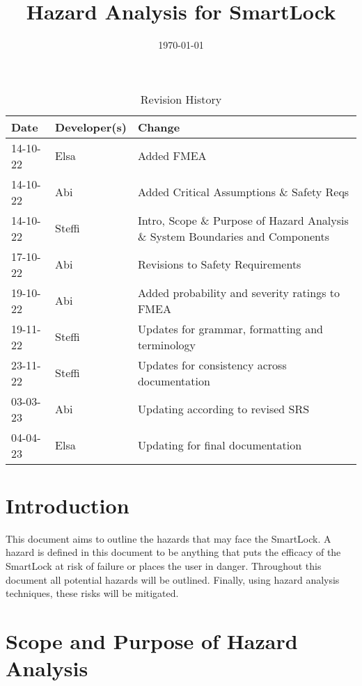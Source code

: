 \documentclass{article}
\title{Hazard Analysis for SmartLock\\\progname}
\author{\authname}
\date{\today}
\begin{document}
\maketitle
\thispagestyle{empty}

\newpage
{}

\begin{table}[hp]
\caption{Revision History} \label{TblRevisionHistory}
\begin{tabularx}{\textwidth}{llX}
\toprule
\textbf{Date} & \textbf{Developer(s)} & \textbf{Change}\\
\midrule
14-10-22 & Elsa & Added FMEA\\
14-10-22 & Abi & Added Critical Assumptions \& Safety Reqs\\
14-10-22 & Steffi & Intro, Scope \& Purpose of Hazard Analysis \& System Boundaries and Components\\
17-10-22 & Abi & Revisions to Safety Requirements\\
19-10-22 & Abi & Added probability and severity ratings to FMEA \\
19-11-22 & Steffi & Updates for grammar, formatting and terminology\\
23-11-22 & Steffi & Updates for consistency across documentation\\
03-03-23 & Abi & Updating according to revised SRS\\
04-04-23 & Elsa & Updating for final documentation\\
\bottomrule
\end{tabularx}
\end{table}

\newpage


\tableofcontents

\newpage


\section{Introduction}
This document aims to outline the hazards that may face the SmartLock.  A hazard is defined in this document to be anything that puts the efficacy of the SmartLock at risk of failure or places the user in danger.  Throughout this document all potential hazards will be outlined. Finally, using hazard analysis techniques,  these risks will be mitigated. 

\section{Scope and Purpose of Hazard Analysis}
\end{document}
